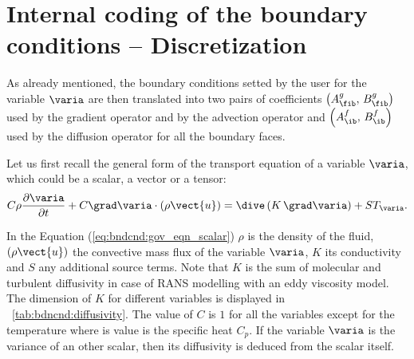 \section{Internal coding of the boundary conditions -- Discretization}

As already mentioned, the boundary conditions setted by the user for the variable $\varia$
are then translated into two pairs of coefficients $\left( A^g_\fib , \, B^g_\fib\right)$ used by the gradient operator and by the advection operator and $\left( A^f_\ib , \, B^f_\ib\right)$ used by the diffusion operator for all the boundary faces.

Let us first recall the general form of the transport equation of a variable $\varia$, which could be a scalar, 
a vector or a tensor: 
\begin{equation}\label{eq:bndcnd:gov_eqn_scalar}
\displaystyle C \rho \frac{\partial \varia}{\partial t} + C \grad \varia \cdot \left( \rho \vect{u} \right) = \dive \left(\displaystyle K \, \grad \varia \right) +ST_\varia .
\end{equation}

In the Equation (\ref{eq:bndcnd:gov_eqn_scalar})
$\rho$ is the density of the fluid, $\left( \rho \vect{u} \right)$ the convective mass flux of the variable $\varia$, $K$ its
conductivity and $S$ any additional source terms. 
Note that $K$ is the sum of molecular and turbulent diffusivity in case of RANS modelling with an eddy viscosity model. 
The dimension of $K$ for different variables is displayed in \tablename~\ref{tab:bdncnd:diffusivity}.
The value of $C$ is $1$ for all the variables except for the temperature where is value is the specific heat $C_p$.
If the variable $\varia$ is the variance of an other scalar, then its diffusivity
is deduced from the scalar itself. 


